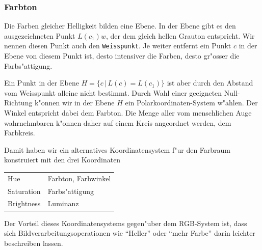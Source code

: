 \subsubsection{Farbton}
Die Farben gleicher Helligkeit bilden eine Ebene. In der Ebene gibt es
den ausgezeichneten Punkt $L(c_1)w$, der dem gleich hellen Grauton
entspricht. Wir nennen diesen Punkt auch den {\tt Weisspunkt}.
Je weiter entfernt ein Punkt $c$ in der Ebene von diesem
Punkt ist, desto intensiver die Farben, desto gr"osser die Farbs"attigung.

Ein Punkt in der Ebene $H=\{c\,|\, L(c)=L(c_1)\}$ ist aber durch
den Abstand vom Weisspunkt alleine nicht bestimmt. Durch Wahl einer 
geeigneten Null-Richtung k"onnen wir in der Ebene $H$ ein
Polarkoordinaten-System w"ahlen. Der Winkel entspricht dabei dem
Farbton.
Die Menge aller vom menschlichen Auge wahrnehmbaren k"onnen daher
auf einem Kreis angeordnet werden, dem Farbkreis.

Damit haben wir ein alternatives Koordinatensystem f"ur den Farbraum
konstruiert mit den drei Koordinaten
\begin{center}
\begin{tabular}{l|l}
\hline
Hue&Farbton, Farbwinkel\\
Saturation&Farbs"attigung\\
Brightness&Luminanz\\
\hline
\end{tabular}
\end{center}
Der Vorteil dieses Koordinatensystems gegen"uber dem RGB-System ist,
dass sich Bildverarbeitungsoperationen wie ``Heller'' oder ``mehr Farbe''
darin leichter beschreiben lassen.

